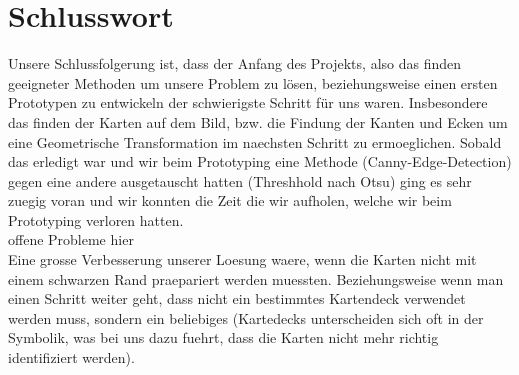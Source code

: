 \documentclass[paper=A4, deutsch]{scrartcl}
\begin{document}
\section{Schlusswort}
Unsere Schlussfolgerung ist, dass der Anfang des Projekts, also das finden geeigneter Methoden um unsere Problem zu lösen,
beziehungsweise einen ersten Prototypen zu entwickeln der schwierigste Schritt für uns waren. Insbesondere das finden der Karten
auf dem Bild, bzw. die Findung der Kanten und Ecken um eine Geometrische Transformation im naechsten Schritt zu ermoeglichen.
Sobald das erledigt war und wir beim Prototyping eine Methode (Canny-Edge-Detection) gegen eine andere ausgetauscht hatten (Threshhold nach Otsu)
ging es sehr zuegig voran und wir konnten die Zeit die wir aufholen, welche wir beim Prototyping verloren hatten.
\\
offene Probleme hier
\\
Eine grosse Verbesserung unserer Loesung waere, wenn die Karten nicht mit einem schwarzen Rand
praepariert werden muessten. Beziehungsweise wenn man einen Schritt weiter geht, dass nicht ein
bestimmtes Kartendeck verwendet werden muss, sondern ein beliebiges (Kartedecks unterscheiden sich oft
in der Symbolik, was bei uns dazu fuehrt, dass die Karten nicht mehr richtig identifiziert werden).



\end{document}

